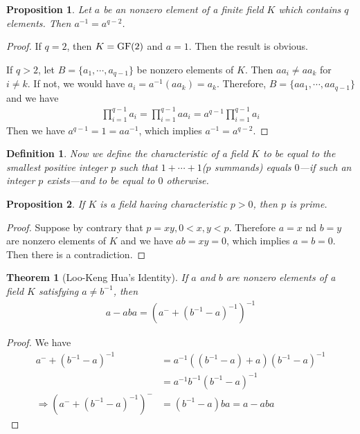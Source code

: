 \documentclass[11pt]{book}
\newtheorem{definition}{Definition}[section]
\newtheorem{theorem}{Theorem}[section]
\newtheorem{proposition}{Proposition}[section]
\theoremstyle{definition}
\numberwithin{equation}{chapter}
\begin{document}
\begin{proposition}
Let $a$ be an nonzero element of a finite field $K$ which contains $q$ elements. Then $a^{-1} = a^{q-2}$.
\end{proposition}
\begin{proof}
If $q = 2$, then $K = {\rm GF}(2)$ and $a = 1$. Then the result is obvious. 

If $q > 2$, let $B = \{a_1, \cdots, a_{q-1}\}$ be nonzero elements of $K$. Then $aa_i\neq aa_k$ for $i\neq k$. If not, we would have $a_i = a^{-1}(aa_k) = a_k$. Therefore, $B = \{a a_1, \cdots, a a_{q-1}\}$ and we have 
\begin{align*}
    \prod^{q-1}_{i=1}a_i = \prod^{q-1}_{i=1}aa_i = a^{q-1}\prod^{q-1}_{i=1}a_i 
\end{align*}
Then we have $a^{q-1} = 1 = a a^{-1}$, which implies $a^{-1} = a^{q-2}$.
\end{proof}

\medskip
\begin{definition}
Now we define the characteristic of a field $K$ to be equal to the smallest positive integer $p$ such that $1+\cdots+1$($p$ summands) equals $0$—if such an integer $p$ exists—and to be equal to $0$ otherwise.
\end{definition}

\medskip

\begin{proposition}
If $K$ is a field having characteristic $p > 0$, then $p$ is prime.
\end{proposition}
\begin{proof}
Suppose by contrary that $p = xy, 0<x,y<p$. Therefore $a = x$ nd $b = y$ are nonzero elements of $K$ and we have $ab = xy = 0$, which implies $a=b=0$. Then there is a contradiction. 
\end{proof}

\medskip

\begin{theorem}[Loo-Keng Hua's Identity]
If $a$ and $b$ are nonzero elements of a field $K$ satisfying $a\neq b^{-1}$, then
\begin{align*}
    a - aba = \left(a^{-} + (b^{-1} - a)^{-1}\right)^{-1}
\end{align*}
\end{theorem}
\begin{proof}
We have
\begin{align*}
    a^{-} + (b^{-1} - a)^{-1} & = a^{-1}\left((b^{-1} - a) + a \right)(b^{-1} - a)^{-1}\\
    & = a^{-1}b^{-1}(b^{-1} - a)^{-1} \\
    \Rightarrow \left(a^{-} + (b^{-1} - a)^{-1}\right)^{-} & = (b^{-1} - a)ba = a - aba
\end{align*}
\end{proof}
\end{document}
